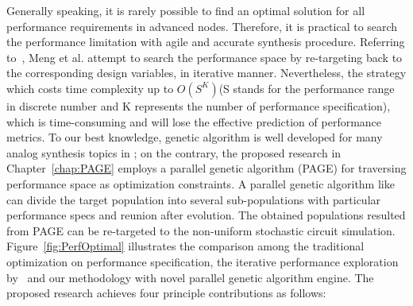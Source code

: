       Generally speaking, it is rarely possible to find an optimal solution for all performance requirements in advanced nodes. Therefore, it is practical to search the performance limitation with agile and accurate synthesis procedure. Referring to~\cite{PerfMap_ISQED2011}, Meng et al. attempt to search the performance space by re-targeting back to the corresponding design variables, in iterative manner. Nevertheless, the strategy which costs time complexity up to $O(S^K)$(S stands for the performance range in discrete number and K represents the number of performance specification), which is time-consuming and will lose the effective prediction of performance metrics. To our best knowledge, genetic algorithm is well developed for many analog synthesis topics in \cite{DARWIN_DAC1995,CAFFEINE_DATE2005,HeteroSyn_DATE2006,NominalYieldArea_AHS2009}; on the contrary, the proposed research in Chapter~\ref{chap:PAGE} employs a parallel genetic algorithm (PAGE) for traversing performance space as optimization constraints. A parallel genetic algorithm like \cite{SurveyPGA1997,SurveyDistPGA1997} can divide the target population into several sub-populations with particular performance specs and reunion after evolution. The obtained populations resulted from PAGE can be re-targeted to the non-uniform stochastic circuit simulation. Figure~\ref{fig:PerfOptimal} illustrates the comparison among the traditional optimization on performance specification, the iterative performance exploration by~\cite{PerfMap_ISQED2011} and our methodology with novel parallel genetic algorithm engine. The proposed research achieves four principle contributions as follows: 

